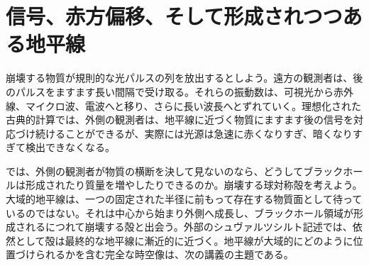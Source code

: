 \section{信号、赤方偏移、そして形成されつつある地平線}

崩壊する物質が規則的な光パルスの列を放出するとしよう。遠方の観測者は、後のパルスをますます長い間隔で受け取る。それらの振動数は、可視光から赤外線、マイクロ波、電波へと移り、さらに長い波長へとずれていく。理想化された古典的計算では、外側の観測者は、地平線に近づく物質にますます後の信号を対応づけ続けることができるが、実際には光源は急速に赤くなりすぎ、暗くなりすぎて検出できなくなる。

\begin{classroomqa}
\end{classroomqa}

\begin{classroomqa}
\end{classroomqa}

\begin{classroomqa}
\end{classroomqa}

では、外側の観測者が物質の横断を決して見ないのなら、どうしてブラックホールは形成されたり質量を増やしたりできるのか。崩壊する球対称殻を考えよう。大域的地平線は、一つの固定された半径に前もって存在する物質面として待っているのではない。それは中心から始まり外側へ成長し、ブラックホール領域が形成されるにつれて崩壊する殻と出会う。外部のシュヴァルツシルト記述では、依然として殻は最終的な地平線に漸近的に近づく。地平線が大域的にどのように位置づけられるかを含む完全な時空像は、次の講義の主題である。

